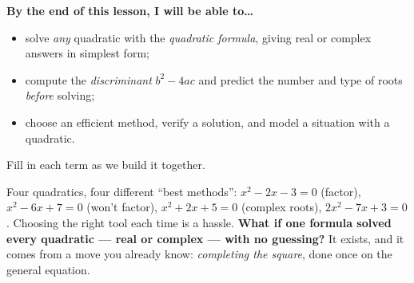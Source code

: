\documentclass[10pt]{article}
\begin{document}

\vspace{0.10in}

\begin{objectivebox}
\textbf{By the end of this lesson, I will be able to\dots}
\begin{itemize}\setlength{\itemsep}{2pt}
  \item solve \emph{any} quadratic with the \emph{quadratic formula}, giving real or complex answers in simplest form;
  \item compute the \emph{discriminant} $b^2-4ac$ and predict the number and type of roots \emph{before} solving;
  \item choose an efficient method, verify a solution, and model a situation with a quadratic.
\end{itemize}
\end{objectivebox}

\vspace{0.06in}

\begin{vocabbox}
\small
Fill in each term as we build it together.
\par\vspace{2pt}
\end{vocabbox}

\begin{hookbox}
Four quadratics, four different ``best methods'': $x^2-2x-3=0$ (factor), $x^2-6x+7=0$ (won't factor),
$x^2+2x+5=0$ (complex roots), $2x^2-7x+3=0$. Choosing the right tool each time is a hassle. \textbf{What if
one formula solved every quadratic --- real or complex --- with no guessing?} It exists, and it comes from
a move you already know: \emph{completing the square}, done once on the general equation.
\end{hookbox}
\end{document}
